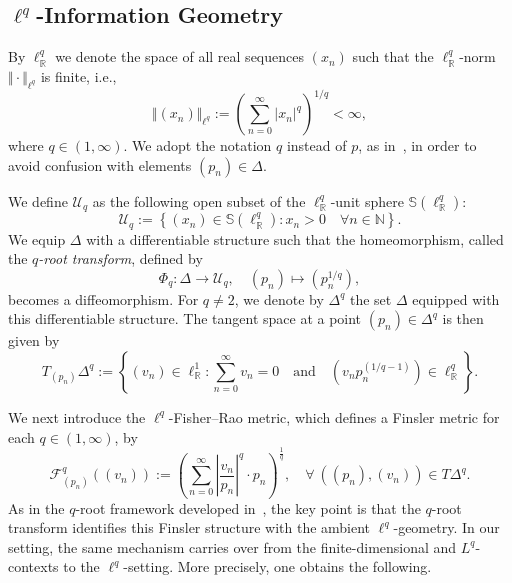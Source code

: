 \documentclass[12pt]{amsart}
\numberwithin{figure}{section}
\numberwithin{table}{section}
\numberwithin{equation}{section}
\def\RR{\mathbb{R}}
\begin{document}
\subsection{\(\ell^q\)-Information Geometry}\label{ss:l_q_information_geometry}

By \(\ell^q_{\RR}\) we denote the space of all real sequences \((x_n)\) such that the \(\ell^q_{\RR}\)-norm \(\Vert \cdot \Vert_{\ell^q}\) is finite, i.e.,
\[
\Vert (x_n) \Vert_{\ell^q} := \left( \sum_{n=0}^{\infty} |x_n|^q \right)^{1/q} < \infty,
\]
where \(q \in (1, \infty)\). We adopt the notation \(q\) instead of \(p\), as in~\cite{bauerLpFisherRaoMetricAmari2024}, in order to avoid confusion with elements \((p_n) \in \Delta\).

We define \(\mathcal{U}_q\) as the following open subset of the \(\ell^q_{\RR}\)-unit sphere \(\mathbb{S}(\ell^q_{\RR})\):
\[
\mathcal{U}_q := \left\{ (x_n) \in \mathbb{S}(\ell^q_{\RR}) : x_n > 0 \quad \forall n \in \mathbb{N} \right\}.
\]
We equip \(\Delta\) with a differentiable structure such that the homeomorphism, called the \emph{\(q\)-root transform}, defined by
\begin{equation}\label{e: def q-root transform}
    \varPhi_q: \Delta \longrightarrow \mathcal{U}_q, \quad (p_n) \mapsto \left(p_n^{1/q}\right),
\end{equation}
becomes a diffeomorphism. For \(q \neq 2\), we denote by \(\Delta^q\) the set \(\Delta\) equipped with this differentiable structure. The tangent space at a point \((p_n) \in \Delta^q\) is then given by
\begin{equation*}\label{e: q diff structure on delta}
	T_{(p_n)}\Delta^q := \left\{ (v_n) \in \ell^1_{\mathbb{R}} : \sum_{n=0}^{\infty} v_n = 0 \quad \text{and} \quad \left(v_n p_n^{(1/q - 1)}\right) \in \ell^q_{\mathbb{R}} \right\}.
\end{equation*}

We next introduce the \(\ell^q\)-Fisher--Rao metric, which defines a Finsler metric for each \(q \in (1, \infty)\), by
\begin{equation}\label{e: def q-Fisher-Rao metric}
    \mathcal{F}^q_{(p_n)}\left( (v_n) \right) := \left( \sum_{n=0}^{\infty} \left\vert \frac{v_n}{p_n} \right\vert^q \cdot p_n \right)^{\frac{1}{q}},
    \quad \forall\ ((p_n), (v_n)) \in T\Delta^q.
\end{equation}
As in the \(q\)-root framework developed in~\cite{bauerLpFisherRaoMetricAmari2024}, the key point is that the \(q\)-root transform identifies this Finsler structure with the ambient \(\ell^q\)-geometry. In our setting, the same mechanism carries over from the finite-dimensional and \(L^q\)-contexts to the \(\ell^q\)-setting. More precisely, one obtains the following.
\end{document}

